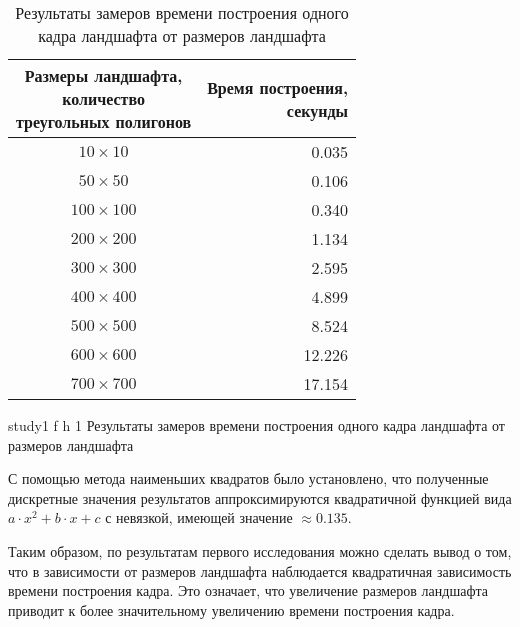 \begin{table}[ht]
	\begin{center}
		\begin{threeparttable}
			\caption{Результаты замеров времени построения одного кадра ландшафта от размеров ландшафта}
			\label{tbl:RenderLandscapeTimeBySize}
			\begin{tabular}{|c|r|}
				\hline
				\bfseries \makecell{Размеры ландшафта, \\ количество \\ треугольных  полигонов} & \bfseries \makecell{Время построения, \\ секунды}  \\
				\hline
				$10\times10$ &  0.035 \\
				\hline
				$50\times50$ &  0.106 \\
				\hline
				$100\times100$ &  0.340 \\
				\hline
				$200\times200$ &  1.134 \\
				\hline
				$300\times300$ &  2.595 \\
				\hline
				$400\times400$ &  4.899 \\
				\hline
				$500\times500$ &  8.524 \\
				\hline
				$600\times600$ &  12.226 \\
				\hline
				$700\times700$ &  17.154 \\
				\hline
			\end{tabular}
		\end{threeparttable}
	\end{center}
\end{table}

\clearpage

{study1} %
{f} %
{h} %
{1\textwidth} %
{Результаты замеров времени построения одного кадра ландшафта от размеров ландшафта} %
	

С помощью метода наименьших квадратов было установлено, что полученные дискретные значения результатов аппроксимируются квадратичной функцией вида $a \cdot x^2 + b \cdot x + c$ с невязкой, имеющей значение $\approx 0.135$.

Таким образом, по результатам первого исследования можно сделать вывод о том, что в зависимости от размеров ландшафта наблюдается квадратичная зависимость времени построения кадра. 
Это означает, что увеличение размеров ландшафта приводит к более значительному увеличению времени построения кадра.


